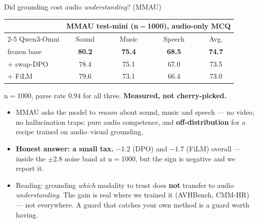 \documentclass[aspectratio=169,11pt]{beamer}
\begin{document}
\begin{frame}{Did grounding cost audio \emph{understanding}? (MMAU)}
\centering
\renewcommand{\arraystretch}{1.2}
\small
\begin{tabular}{l cccc}
\toprule
 & \multicolumn{4}{c}{MMAU test-mini (n$=$1000), audio-only MCQ} \\
\cmidrule(lr){2-5}
Qwen3-Omni & Sound & Music & Speech & Avg. \\
\midrule
frozen base     & \textbf{80.2} & \textbf{75.4} & \textbf{68.5} & \textbf{74.7} \\ %
+ swap-DPO      & 78.4 & 75.1 & 67.0 & 73.5 \\ %
+ FiLM          & 79.6 & 73.1 & 66.4 & 73.0 \\ %
\bottomrule
\end{tabular}
\par\vspace{0.2em}
{\scriptsize n$=$1000, parse rate $0.94$ for all three. \textbf{Measured, not cherry-picked.}}
\vfill
\begin{itemize}\small
\item MMAU asks the model to \emph{reason} about sound, music and speech --- no video, no
hallucination traps: pure audio competence, and \textbf{off-distribution} for a recipe trained on
audio--visual grounding.
\item \textbf{Honest answer: a small tax.} $-1.2$ (DPO) and $-1.7$ (FiLM) overall --- inside the
$\pm2.8$ noise band at n$=$1000, but the sign is negative and we report it.
\item Reading: grounding \emph{which} modality to trust does \textbf{not} transfer to
audio \emph{understanding}. The gain is real where we trained it (AVHBench, CMM-HR) --- not
everywhere. A guard that catches your own method is a guard worth having.
\end{itemize}
\end{frame}
\end{document}
